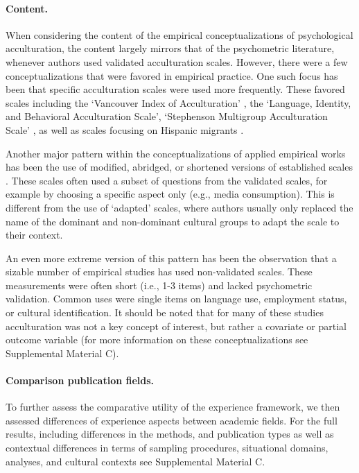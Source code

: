 \color{blue}
\paragraph{Content.}

When considering the content of the empirical conceptualizations of
psychological acculturation, the content largely mirrors that of the
psychometric literature, whenever authors used validated acculturation
scales. However, there were a few conceptualizations that were favored
in empirical practice. One such focus has been that specific
acculturation scales were used more frequently. These favored scales
including the `Vancouver Index of Acculturation' \citep[][]{Ryder2000},
the `Language, Identity, and Behavioral Acculturation Scale',
`Stephenson Multigroup Acculturation Scale' \citep[][]{Stephenson2000},
as well as scales focusing on Hispanic migrants
\citep[][]{Cuellar1995a, Marin1987, Marin1987}.

Another major pattern within the conceptualizations of applied empirical
works has been the use of modified, abridged, or shortened versions of
established scales \citep[e.g.,][]{Green2014,Im2009}. These scales often
used a subset of questions from the validated scales, for example by
choosing a specific aspect only (e.g., media consumption). This is
different from the use of `adapted' scales, where authors usually only
replaced the name of the dominant and non-dominant cultural groups to
adapt the scale to their context.

An even more extreme version of this pattern has been the observation
that a sizable number of empirical studies has used non-validated
scales. These measurements were often short (i.e., 1-3 items) and lacked
psychometric validation. Common uses were single items on language use,
employment status, or cultural identification. It should be noted that
for many of these studies acculturation was not a key concept of
interest, but rather a covariate or partial outcome variable (for more
information on these conceptualizations see Supplemental Material C).
\color{black}

\paragraph{Comparison publication fields.}

To further assess the comparative utility of the experience framework,
we then assessed differences of experience aspects between academic
fields. For the full results, including differences in the methods, and
publication types as well as contextual differences in terms of sampling
procedures, situational domains, analyses, and cultural contexts see
Supplemental Material C.

